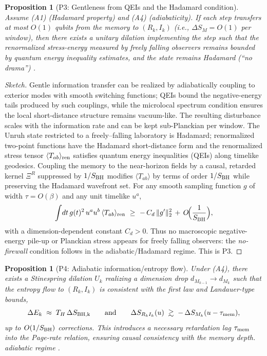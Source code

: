 \documentclass[aps,prd,preprint,onecolumn,superscriptaddress,nofootinbib,longbibliography,floatfix,11pt,showpacs,showkeys]{revtex4-2}
\newcommand{\ie}{\textit{i.e.}\xspace}
\theoremstyle{plain}
\newtheorem{proposition}[theorem]{Proposition}
\theoremstyle{definition}
\theoremstyle{remark}
\begin{document}
\begin{proposition}[P3: Gentleness from QEIs and the Hadamard condition]
\label{prop:P3-gentle}
Assume (A1) (Hadamard property) and (A4) (adiabaticity). If each step transfers at most $O(1)$ qubits from the memory to $(R_k,I_k)$
(\ie, $\Delta S_M=O(1)$ per window), then there exists a unitary dilation implementing the step such that the renormalized stress-energy
measured by freely falling observers remains bounded by quantum energy inequality estimates, and the state remains Hadamard
(``no drama'') \cite{Radzikowski:1996, Fewster:2012}.
\end{proposition}
\begin{proof}[Sketch]
Gentle information transfer can be realized by adiabatically coupling to exterior modes with smooth switching functions; QEIs bound the
negative-energy tails produced by such couplings, while the microlocal spectrum condition ensures the local short-distance structure
remains vacuum-like. The resulting disturbance scales with the information rate and can be kept sub-Planckian per window.
The Unruh state restricted to a freely--falling laboratory is Hadamard; renormalized two-point functions have the Hadamard short-distance form and the renormalized stress tensor $\langle T_{ab}\rangle_{\rm ren}$ satisfies quantum energy inequalities (QEIs) along timelike geodesics. Coupling the memory to the near-horizon fields by a causal, retarded kernel $\Xi^R$ suppressed by $1/S_{\rm BH}$ modifies $\langle T_{ab}\rangle$ by terms of order $1/S_{\rm BH}$ while preserving the Hadamard wavefront set. For any smooth sampling function $g$ of width $\tau=O(\beta)$ and any unit timelike $u^a$,
\begin{equation}
\int\!dt\,g(t)^2\,u^a u^b\,\langle T_{ab}\rangle_{\rm ren} \ \ge\ -\,C_d\,\|g'\|_2^2 \,+\,O\!\Big(\frac{1}{S_{\rm BH}}\Big),
\end{equation}
with a dimension-dependent constant $C_d>0$. Thus no macroscopic negative-energy pile-up or Planckian stress appears for freely falling observers: the \emph{no-firewall} condition follows in the adiabatic/Hadamard regime. This is P3.
\end{proof}
\begin{proposition}[P4: Adiabatic information/entropy flow]
\label{prop:P4-adiabatic}
Under (A4), there exists a Stinespring dilation $U_k$ realizing a dimension drop $d_{M_{k-1}}\!\to d_{M_k}$ such that the entropy flow to
$(R_k,I_k)$ is consistent with the first law and Landauer-type bounds,
\[
\Delta E_k \;\approx\; T_H\,\Delta S_{\rm BH,k}\qquad\text{and}\qquad \Delta S_{R_k I_k}(u)\;\gtrsim\; -\,\Delta S_{M_k}(u - \tau_{\rm mem}),
\]
up to $O(1/S_{\rm BH})$ corrections. This introduces a necessary \emph{retardation lag} $\tau_{\rm mem}$ into the Page-rate relation, ensuring causal consistency with the memory depth.
adiabatic regime \cite{Page:1993, BrownYork:1993, Brandao:2016}.
\end{proposition}
\end{document}
